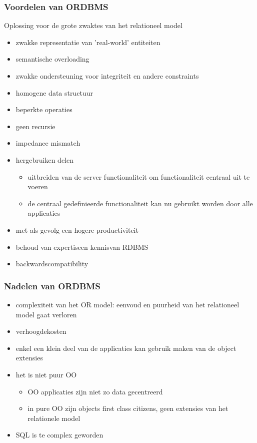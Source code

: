 \documentclass[a4paper,12pt]{article}
\begin{document}
\subsubsection{Voordelen van ORDBMS}
Oplossing voor de grote zwaktes van het relationeel model
\begin{itemize}
\item zwakke representatie van 'real-world' entiteiten
\item semantische overloading
\item zwakke ondersteuning voor integriteit en andere constraints
\item homogene data structuur
\item beperkte operaties
\item geen recursie
\item impedance mismatch
\item hergebruiken delen
\begin{itemize}
\item uitbreiden van de server functionaliteit om functionaliteit centraal uit te voeren
\item de centraal gedefinieerde functionaliteit kan nu gebruikt worden door alle applicaties
\end{itemize}
\item met als gevolg een hogere productiviteit
\item behoud van expertiseen kennisvan RDBMS
\item backwardscompatibility
\end{itemize}

\subsubsection{Nadelen van ORDBMS}
\begin{itemize}
\item complexiteit van het OR model: eenvoud en puurheid van het relationeel model gaat verloren
\item verhoogdekosten
\item enkel een klein deel van de applicaties kan gebruik maken van de object extensies
\item het is niet puur OO
\begin{itemize}
\item OO applicaties zijn niet zo data gecentreerd
\item in pure OO zijn objects first class citizens, geen extensies van het relationele model
\end{itemize}
\item SQL is te complex geworden
\end{itemize}
\end{document}
